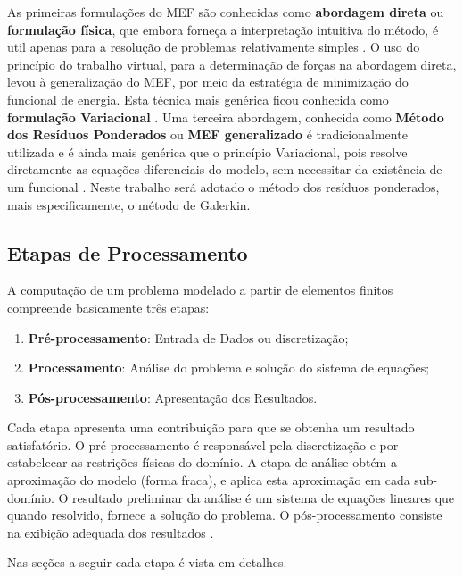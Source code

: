 \documentclass[
    12pt,               %
    openright,          %
    oneside,
    a4paper,            %
    english,            %
    french,             %
    spanish,            %
    brazil              %
    ]{abntex2}
\begin{document}
As primeiras formulações do MEF são conhecidas como \textbf{abordagem direta} ou \textbf{formulação física}, que embora forneça a interpretação intuitiva do método, é util apenas para a resolução de problemas relativamente simples \cite[p. 6]{huebner}. O uso do princípio do trabalho virtual, para a determinação de forças na abordagem direta, levou à generalização do MEF, por meio da estratégia de minimização do funcional de energia. Esta técnica mais genérica  ficou conhecida como \textbf{formulação Variacional} \cite[p. 113]{desai} \cite[p. 20]{zien}. Uma terceira abordagem, conhecida como \textbf{Método dos Resíduos Ponderados} ou \textbf{MEF generalizado} \cite[p. 61]{zien} é tradicionalmente utilizada e é ainda mais genérica que o princípio Variacional, pois resolve diretamente as equações diferenciais do modelo, sem necessitar da existência de um funcional \cite[p. 261]{desai}. Neste trabalho será adotado o método dos resíduos ponderados, mais especificamente, o método de Galerkin.







\subsection{Etapas de Processamento}
A computação de um problema modelado a partir de elementos finitos compreende basicamente três etapas: 
\begin{enumerate}  
\item \textbf{Pré-processamento}: Entrada de Dados ou discretização;
\item \textbf{Processamento}: Análise do problema e  solução do sistema de equações;
\item \textbf{Pós-processamento}: Apresentação dos Resultados. 
\end{enumerate}

Cada etapa apresenta uma contribuição para que se obtenha um resultado satisfatório. O pré-processamento é responsável pela discretização e por estabelecar as restrições físicas do domínio. A etapa de análise obtém a aproximação do modelo (forma fraca), e aplica esta aproximação em cada sub-domínio. O resultado preliminar da análise é um sistema de equações lineares que quando resolvido, fornece a solução do problema.  O pós-processamento consiste na exibição adequada dos resultados \cite[p. 665, 666]{zien}.


Nas seções a seguir cada etapa é vista em detalhes.
\end{document}
